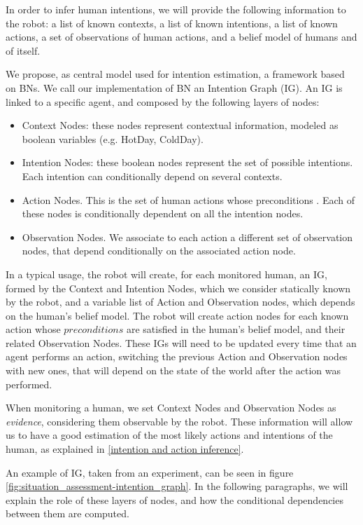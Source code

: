 In order to infer human intentions, we will provide the following information to the robot: a list of known contexts, a list of known intentions, a list of known actions, a set of observations of human actions, and a belief model of humans and of itself.

We propose, as central model used for intention estimation, a framework based on BNs. We call our implementation of BN an Intention Graph (IG).
An IG is linked to a specific agent, and composed by the following layers of nodes:
\begin{itemize}
\item Context Nodes: these nodes represent contextual information, modeled as boolean variables (e.g. HotDay, ColdDay).
\item Intention Nodes: these boolean nodes represent the set of possible intentions. Each intention can conditionally depend on several contexts.
\item Action Nodes. This is the set of human actions whose preconditions . Each of these nodes is conditionally dependent on all the intention nodes. 
\item Observation Nodes. We associate to each action a different set of observation nodes, that depend conditionally on the associated action node. 
\end{itemize}

In a typical usage, the robot will create, for each monitored human, an IG, formed by the Context and Intention Nodes, which we consider statically known by the robot, and a variable list of Action and Observation nodes, which depends on the human's belief model. The robot will create action nodes for each known action whose $preconditions$ are satisfied in the human's belief model, and their related Observation Nodes. These IGs will need to be updated every time that an agent performs an action, switching the previous Action and Observation nodes with new ones, that will depend on the state of the world after the action was performed.

When monitoring a human, we set Context Nodes and Observation Nodes as \textit{evidence}, considering them observable by the robot. These information will allow us to have a good estimation of the most likely actions and intentions of the human, as explained in \ref{intention and action inference}.

An example of IG, taken from an experiment, can be seen in figure \ref{fig:situation_assessment-intention_graph}. In the following paragraphs, we will explain the role of these layers of nodes, and how the conditional dependencies between them are computed.

